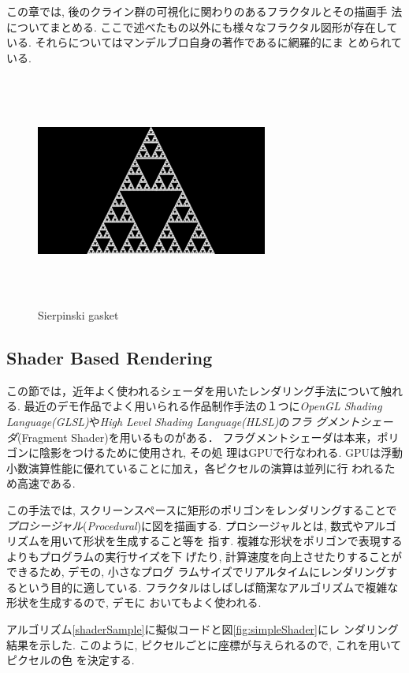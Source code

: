  この章では, 後のクライン群の可視化に関わりのあるフラクタルとその描画手
 法についてまとめる.
 ここで述べたもの以外にも様々なフラクタル図形が存在している.
 それらについてはマンデルブロ自身の著作である\cite{fractal}に網羅的にま
 とめられている.

\begin{figure}[htbp]
 \center
 \includegraphics[width=3in, height=3in, keepaspectratio]{../img/fractal/gasket.pdf}
 \caption{Sierpinski gasket}
 \label{fig:gasket}
\end{figure}

\subsection{Shader Based Rendering}

この節では，近年よく使われるシェーダを用いたレンダリング手法について触れる.
最近のデモ作品でよく用いられる作品制作手法の１つに\textit{OpenGL Shading
Language(GLSL)}や\textit{High Level Shading Language(HLSL)}の\emph{フラ
グメントシェーダ}(Fragment Shader)を用いるものがある．
フラグメントシェーダは本来，ポリゴンに陰影をつけるために使用され, その処
理はGPUで行なわれる.
GPUは浮動小数演算性能に優れていることに加え，各ピクセルの演算は並列に行
われるため高速である.

この手法では, スクリーンスペースに矩形のポリゴンをレンダリングすることで
\emph{プロシージャル}(\textit{Procedural})に図を描画する.
プロシージャルとは, 数式やアルゴリズムを用いて形状を生成すること等を
指す.
複雑な形状をポリゴンで表現するよりもプログラムの実行サイズを下
げたり, 計算速度を向上させたりすることができるため, デモの, 小さなプログ
ラムサイズでリアルタイムにレンダリングするという目的に適している.
フラクタルはしばしば簡潔なアルゴリズムで複雑な形状を生成するので, デモに
おいてもよく使われる.

アルゴリズム\ref{shaderSample}に擬似コードと図\ref{fig:simpleShader}にレ
ンダリング結果を示した.
このように, ピクセルごとに座標が与えられるので, これを用いてピクセルの色
を決定する.

